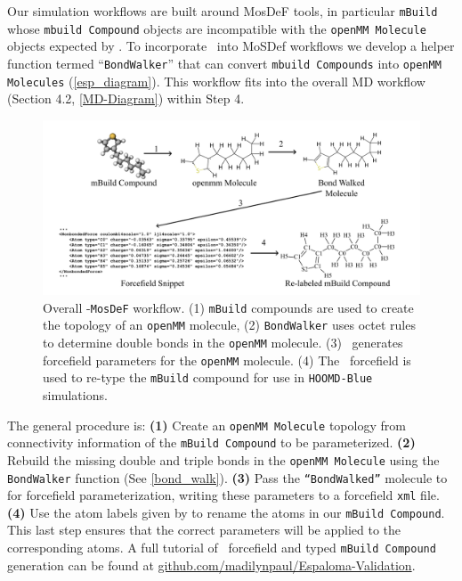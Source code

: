 Our simulation workflows are built around MosDeF tools\cite{cummings_opensource_2021}, in particular \texttt{mBuild} \cite{Klein_mbuild} whose \texttt{mbuild Compound} objects are incompatible with the \texttt{openMM Molecule} objects expected by \esp.
To incorporate \esp~into MoSDef workflows we develop a helper function termed ``\texttt{BondWalker}'' that can convert \texttt{mbuild Compounds} into \texttt{openMM Molecules} (\autoref{esp_diagram}).
This workflow fits into the overall MD workflow (Section 4.2, \autoref{MD-Diagram}) within Step 4. 
\begin{figure}
    \centering
    \includegraphics[width=1\linewidth]{src/figures/FF_figs/esp_fig.png}
    \caption{Overall \esp-\texttt{MosDeF} workflow. (1) \texttt{mBuild} compounds are used to create the topology of an \texttt{openMM} molecule, (2) \texttt{BondWalker} uses octet rules to determine double bonds in the \texttt{openMM} molecule. (3) \esp~generates forcefield parameters for the \texttt{openMM} molecule. (4) The \espff~forcefield is used to re-type the \texttt{mBuild} compound for use in \texttt{HOOMD-Blue} simulations.}
    \label{esp_diagram}
\end{figure}
The general procedure is: \textbf{(1)} Create an \texttt{openMM Molecule} topology from connectivity information of the \texttt{mBuild Compound} to be parameterized. 
\textbf{(2)} Rebuild the missing double and triple bonds in the \texttt{openMM Molecule} using the \texttt{BondWalker} function (See \autoref{bond_walk}). 
\textbf{(3)} Pass the \texttt{``BondWalked''} molecule to \esp for forcefield parameterization, writing these parameters to a forcefield \texttt{xml} file.
\textbf{(4)} Use the atom labels given by \esp to rename the atoms in our \texttt{mBuild Compound}. 
This last step ensures that the correct parameters will be applied to the corresponding atoms. 
A full tutorial of \esp~forcefield and typed \texttt{mBuild Compound} generation can be found at \url{github.com/madilynpaul/Espaloma-Validation}. 
